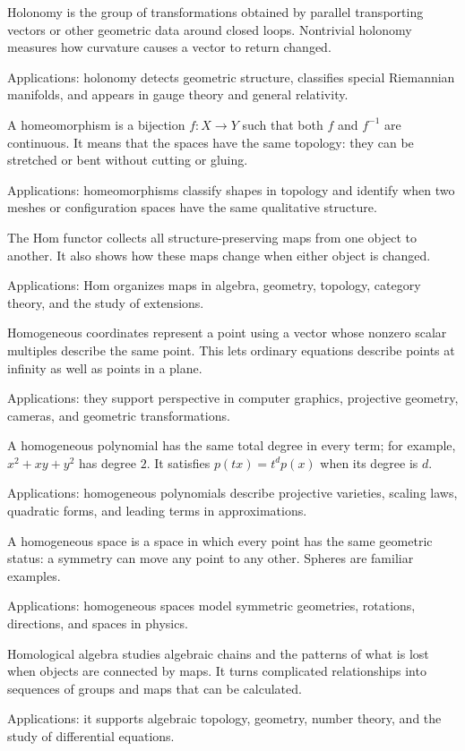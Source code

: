 Holonomy is the group of transformations obtained by parallel transporting vectors or other geometric data around closed loops. Nontrivial holonomy measures how curvature causes a vector to return changed. \par\noindent Applications: holonomy detects geometric structure, classifies special Riemannian manifolds, and appears in gauge theory and general relativity.

A homeomorphism is a bijection $f:X\to Y$ such that both $f$ and $f^{-1}$ are continuous. It means that the spaces have the same topology: they can be stretched or bent without cutting or gluing. \par\noindent Applications: homeomorphisms classify shapes in topology and identify when two meshes or configuration spaces have the same qualitative structure.

The Hom functor collects all structure-preserving maps from one object to another. It also shows how these maps change when either object is changed. \par\noindent Applications: Hom organizes maps in algebra, geometry, topology, category theory, and the study of extensions.

Homogeneous coordinates represent a point using a vector whose nonzero scalar multiples describe the same point. This lets ordinary equations describe points at infinity as well as points in a plane. \par\noindent Applications: they support perspective in computer graphics, projective geometry, cameras, and geometric transformations.

A homogeneous polynomial has the same total degree in every term; for example, $x^2+xy+y^2$ has degree $2$. It satisfies $p(tx)=t^d p(x)$ when its degree is $d$. \par\noindent Applications: homogeneous polynomials describe projective varieties, scaling laws, quadratic forms, and leading terms in approximations.

A homogeneous space is a space in which every point has the same geometric status: a symmetry can move any point to any other. Spheres are familiar examples. \par\noindent Applications: homogeneous spaces model symmetric geometries, rotations, directions, and spaces in physics.

Homological algebra studies algebraic chains and the patterns of what is lost when objects are connected by maps. It turns complicated relationships into sequences of groups and maps that can be calculated. \par\noindent Applications: it supports algebraic topology, geometry, number theory, and the study of differential equations.

